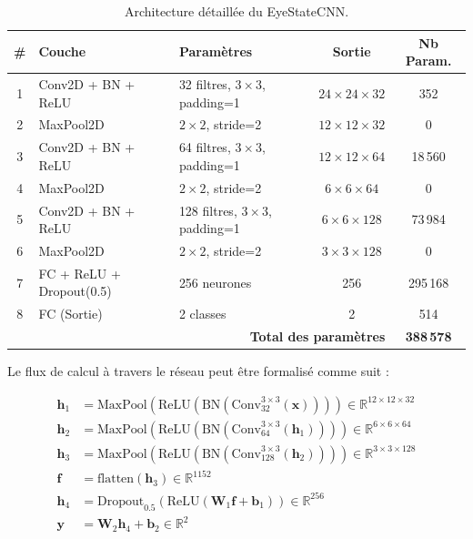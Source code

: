 \begin{table}[H]
\centering
\caption{Architecture détaillée du EyeStateCNN.}
\label{tab:eye_cnn}
\renewcommand{\arraystretch}{1.3}
\begin{tabularx}{\textwidth}{|c|l|l|c|c|}
\hline
\rowcolor{stellantisblue!15}
\textbf{\#} & \textbf{Couche} & \textbf{Paramètres} & \textbf{Sortie} & \textbf{Nb Param.} \\
\hline
1 & Conv2D + BN + ReLU & 32 filtres, $3 \times 3$, padding=1 & $24 \times 24 \times 32$ & 352 \\
\hline
2 & MaxPool2D & $2 \times 2$, stride=2 & $12 \times 12 \times 32$ & 0 \\
\hline
3 & Conv2D + BN + ReLU & 64 filtres, $3 \times 3$, padding=1 & $12 \times 12 \times 64$ & 18\,560 \\
\hline
4 & MaxPool2D & $2 \times 2$, stride=2 & $6 \times 6 \times 64$ & 0 \\
\hline
5 & Conv2D + BN + ReLU & 128 filtres, $3 \times 3$, padding=1 & $6 \times 6 \times 128$ & 73\,984 \\
\hline
6 & MaxPool2D & $2 \times 2$, stride=2 & $3 \times 3 \times 128$ & 0 \\
\hline
7 & FC + ReLU + Dropout(0.5) & 256 neurones & 256 & 295\,168 \\
\hline
8 & FC (Sortie) & 2 classes & 2 & 514 \\
\hline
\multicolumn{4}{|r|}{\textbf{Total des paramètres}} & \textbf{388\,578} \\
\hline
\end{tabularx}
\end{table}

Le flux de calcul à travers le réseau peut être formalisé comme suit :

\begin{align}
\mathbf{h}_1 &= \text{MaxPool}\left(\text{ReLU}\left(\text{BN}\left(\text{Conv}_{32}^{3\times3}(\mathbf{x})\right)\right)\right) \in \mathbb{R}^{12 \times 12 \times 32} \label{eq:layer1} \\
\mathbf{h}_2 &= \text{MaxPool}\left(\text{ReLU}\left(\text{BN}\left(\text{Conv}_{64}^{3\times3}(\mathbf{h}_1)\right)\right)\right) \in \mathbb{R}^{6 \times 6 \times 64} \label{eq:layer2} \\
\mathbf{h}_3 &= \text{MaxPool}\left(\text{ReLU}\left(\text{BN}\left(\text{Conv}_{128}^{3\times3}(\mathbf{h}_2)\right)\right)\right) \in \mathbb{R}^{3 \times 3 \times 128} \label{eq:layer3} \\
\mathbf{f} &= \text{flatten}(\mathbf{h}_3) \in \mathbb{R}^{1152} \label{eq:flatten} \\
\mathbf{h}_4 &= \text{Dropout}_{0.5}\left(\text{ReLU}\left(\mathbf{W}_1 \mathbf{f} + \mathbf{b}_1\right)\right) \in \mathbb{R}^{256} \label{eq:fc1} \\
\mathbf{y} &= \mathbf{W}_2 \mathbf{h}_4 + \mathbf{b}_2 \in \mathbb{R}^{2} \label{eq:fc2}
\end{align}

